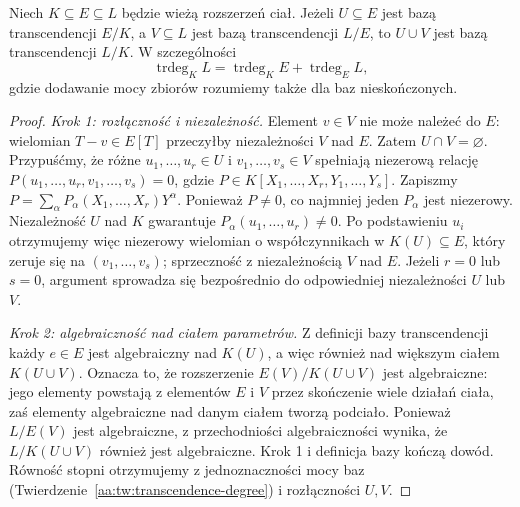 \begin{twierdzenie}
\label{aa:tw:transcendence-tower}
Niech $K\subseteq E\subseteq L$ będzie wieżą rozszerzeń ciał.
Jeżeli $U\subseteq E$ jest bazą transcendencji $E/K$,
a $V\subseteq L$ jest bazą transcendencji $L/E$,
to $U\cup V$ jest bazą transcendencji $L/K$. W szczególności
\[
 \operatorname{trdeg}_K L
 =\operatorname{trdeg}_K E+\operatorname{trdeg}_E L,
\]
gdzie dodawanie mocy zbiorów rozumiemy także dla baz
nieskończonych.
\end{twierdzenie}
\begin{proof}
\emph{Krok 1: rozłączność i niezależność.}
Element $v\in V$ nie może należeć do $E$: wielomian
$T-v\in E[T]$ przeczyłby niezależności $V$ nad $E$.
Zatem $U\cap V=\varnothing$.
Przypuśćmy, że różne $u_1,\ldots,u_r\in U$ i
$v_1,\ldots,v_s\in V$ spełniają niezerową relację
$P(u_1,\ldots,u_r,v_1,\ldots,v_s)=0$, gdzie
$P\in K[X_1,\ldots,X_r,Y_1,\ldots,Y_s]$.
Zapiszmy $P=\sum_\alpha P_\alpha(X_1,\ldots,X_r)Y^\alpha$.
Ponieważ $P\ne0$, co najmniej jeden $P_\alpha$ jest
niezerowy. Niezależność $U$ nad $K$ gwarantuje
$P_\alpha(u_1,\ldots,u_r)\ne0$.
Po podstawieniu $u_i$ otrzymujemy więc niezerowy
wielomian o współczynnikach w $K(U)\subseteq E$,
który zeruje się na $(v_1,\ldots,v_s)$; sprzeczność
z niezależnością $V$ nad $E$.
Jeżeli $r=0$ lub $s=0$, argument sprowadza się
bezpośrednio do odpowiedniej niezależności $U$ lub $V$.

\emph{Krok 2: algebraiczność nad ciałem parametrów.}
Z definicji bazy transcendencji każdy $e\in E$ jest
algebraiczny nad $K(U)$, a więc również nad większym
ciałem $K(U\cup V)$. Oznacza to, że rozszerzenie
$E(V)/K(U\cup V)$ jest algebraiczne: jego elementy
powstają z elementów $E$ i $V$ przez skończenie wiele
działań ciała, zaś elementy algebraiczne nad danym
ciałem tworzą podciało.
Ponieważ $L/E(V)$ jest algebraiczne, z przechodniości
algebraiczności wynika, że $L/K(U\cup V)$ również
jest algebraiczne. Krok 1 i definicja bazy kończą dowód.
Równość stopni otrzymujemy z jednoznaczności mocy baz
(Twierdzenie~\ref{aa:tw:transcendence-degree}) i rozłączności
$U,V$.
\end{proof}

